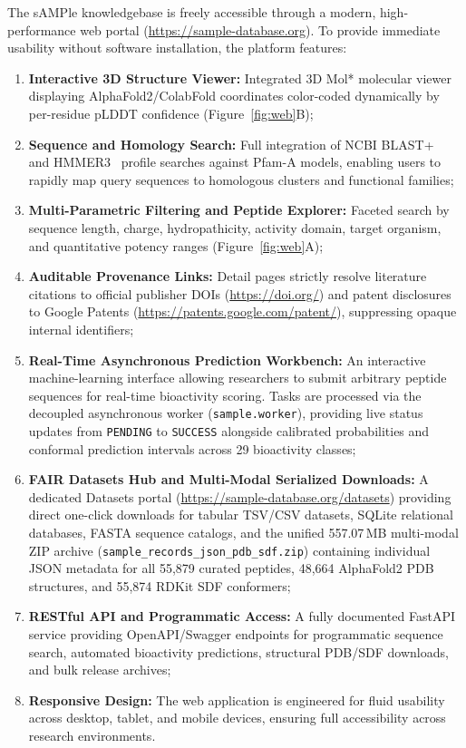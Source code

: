 \documentclass[unnumsec,webpdf,contemporary,large]{oup-authoring-template}%
\begin{document}
The sAMPle knowledgebase is freely accessible through a modern, high-performance web portal (\url{https://sample-database.org}). To provide immediate usability without software installation, the platform features:
\begin{enumerate}
    \item \textbf{Interactive 3D Structure Viewer:} Integrated 3D Mol* molecular viewer~\cite{sehnal2021molstar} displaying AlphaFold2/ColabFold coordinates color-coded dynamically by per-residue pLDDT confidence (Figure~\ref{fig:web}B);
    \item \textbf{Sequence and Homology Search:} Full integration of NCBI BLAST+~\cite{camacho2009blast} and HMMER3~\cite{eddy2011accelerated} profile searches against Pfam-A models, enabling users to rapidly map query sequences to homologous clusters and functional families;
    \item \textbf{Multi-Parametric Filtering and Peptide Explorer:} Faceted search by sequence length, charge, hydropathicity, activity domain, target organism, and quantitative potency ranges (Figure~\ref{fig:web}A);
    \item \textbf{Auditable Provenance Links:} Detail pages strictly resolve literature citations to official publisher DOIs (\url{https://doi.org/}) and patent disclosures to Google Patents (\url{https://patents.google.com/patent/}), suppressing opaque internal identifiers;
    \item \textbf{Real-Time Asynchronous Prediction Workbench:} An interactive machine-learning interface allowing researchers to submit arbitrary peptide sequences for real-time bioactivity scoring. Tasks are processed via the decoupled asynchronous worker (\texttt{sample.worker}), providing live status updates from \texttt{PENDING} to \texttt{SUCCESS} alongside calibrated probabilities and conformal prediction intervals across 29 bioactivity classes;
    \item \textbf{FAIR Datasets Hub and Multi-Modal Serialized Downloads:} A dedicated Datasets portal (\url{https://sample-database.org/datasets}) providing direct one-click downloads for tabular TSV/CSV datasets, SQLite relational databases, FASTA sequence catalogs, and the unified 557.07\,MB multi-modal ZIP archive (\texttt{sample\_records\_json\_pdb\_sdf.zip}) containing individual JSON metadata for all 55,879 curated peptides, 48,664 AlphaFold2 PDB structures, and 55,874 RDKit SDF conformers;
    \item \textbf{RESTful API and Programmatic Access:} A fully documented FastAPI service providing OpenAPI/Swagger endpoints for programmatic sequence search, automated bioactivity predictions, structural PDB/SDF downloads, and bulk release archives;
    \item \textbf{Responsive Design:} The web application is engineered for fluid usability across desktop, tablet, and mobile devices, ensuring full accessibility across research environments.
\end{enumerate}
\end{document}
